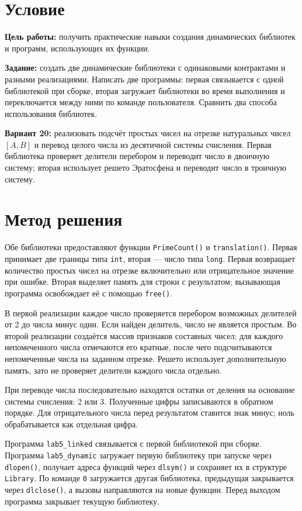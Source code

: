 \documentclass[12pt, a4paper]{article}
\begin{document}


\section{Условие}

\textbf{Цель работы:} получить практические навыки создания динамических библиотек и программ, использующих их функции.

\textbf{Задание:} создать две динамические библиотеки с одинаковыми контрактами и разными реализациями. Написать две программы: первая связывается с одной библиотекой при сборке, вторая загружает библиотеки во время выполнения и переключается между ними по команде пользователя. Сравнить два способа использования библиотек.

\textbf{Вариант 20:} реализовать подсчёт простых чисел на отрезке натуральных чисел $[A, B]$ и перевод целого числа из десятичной системы счисления. Первая библиотека проверяет делители перебором и переводит число в двоичную систему; вторая использует решето Эратосфена и переводит число в троичную систему.

\section{Метод решения}

Обе библиотеки предоставляют функции \texttt{PrimeCount()} и \texttt{translation()}. Первая принимает две границы типа \texttt{int}, вторая --- число типа \texttt{long}. Первая возвращает количество простых чисел на отрезке включительно или отрицательное значение при ошибке. Вторая выделяет память для строки с результатом; вызывающая программа освобождает её с помощью \texttt{free()}.

В первой реализации каждое число проверяется перебором возможных делителей от 2 до числа минус один. Если найден делитель, число не является простым. Во второй реализации создаётся массив признаков составных чисел: для каждого непомеченного числа отмечаются его кратные, после чего подсчитываются непомеченные числа на заданном отрезке. Решето использует дополнительную память, зато не проверяет делители каждого числа отдельно.

При переводе числа последовательно находятся остатки от деления на основание системы счисления: 2 или 3. Полученные цифры записываются в обратном порядке. Для отрицательного числа перед результатом ставится знак минус; ноль обрабатывается как отдельная цифра.

Программа \texttt{lab5\_linked} связывается с первой библиотекой при сборке. Программа \texttt{lab5\_dynamic} загружает первую библиотеку при запуске через \texttt{dlopen()}, получает адреса функций через \texttt{dlsym()} и сохраняет их в структуре \texttt{Library}. По команде \texttt{0} загружается другая библиотека, предыдущая закрывается через \texttt{dlclose()}, а вызовы направляются на новые функции. Перед выходом программа закрывает текущую библиотеку.
\end{document}
